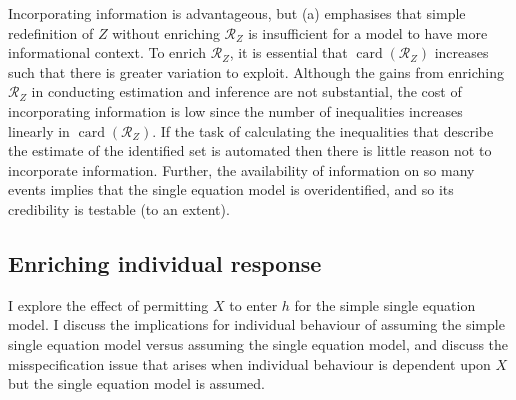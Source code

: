 \documentclass[12pt,a4paper,twoside]{article}
\DeclareMathOperator*{\card}{card}
\numberwithin{equation}{section}
\begin{document}
Incorporating information is advantageous, but (a) emphasises that simple redefinition of $Z$ without enriching $\mathcal{R}_Z$ is insufficient for a model to have more informational context. To enrich $\mathcal{R}_Z$, it is essential that $\card (\mathcal{R}_Z)$ increases such that there is greater variation to exploit. Although the gains from enriching $\mathcal{R}_Z$ in conducting estimation and inference are not substantial, the cost of incorporating information is low since the number of inequalities increases linearly in $\card( \mathcal{R}_Z)$. If the task of calculating the inequalities that describe the estimate of the identified set is automated then there is little reason not to incorporate information. Further, the availability of information on so many events implies that the single equation model is overidentified, and so its credibility is testable (to an extent).
\subsection{Enriching individual response}
I explore the effect of permitting $X$ to enter $h$ for the simple single equation model. I discuss the implications for individual behaviour of assuming the simple single equation model versus assuming the single equation model, and discuss the misspecification issue that arises when individual behaviour is dependent upon $X$ but the single equation model is assumed. 
\end{document}
